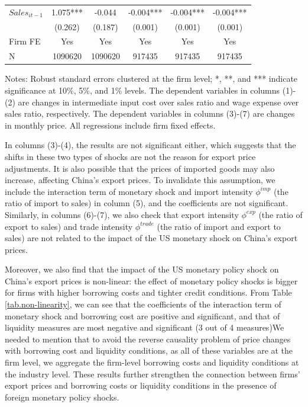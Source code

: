 \begin{table}[htbp]
{\begin{threeparttable}
\begin{tabular}{lccccc}
        $Sales_{it-1}$ &  1.075*** & -0.044   & -0.004*** & -0.004*** & -0.004*** \\
              &  (0.262) & (0.187) & (0.001) & (0.001) & (0.001) \\
        \midrule
        Firm FE & Yes   & Yes   & Yes   & Yes   & Yes \\
        N     & 1090620 & 1090620 & 917435 & 917435 & 917435 \\
        \bottomrule
    \end{tabular}
        \begin{tablenotes}
            \footnotesize
            \item Notes: Robust standard errors clustered at the firm level;  *, **, and *** indicate significance at 10\%, 5\%, and 1\% levels. The dependent variables in columns (1)-(2) are changes in intermediate input cost over sales ratio and wage expense over sales ratio, respectively. The dependent variables in columns (3)-(7) are changes in monthly price. All regressions include firm fixed effects.
	\end{tablenotes}
    \end{threeparttable}
    }
    \label{tab.other}
\end{table}

In columns (3)-(4), the results are not significant either, which suggests that the shifts in these two types of shocks are not the reason for export price adjustments. It is also possible that the prices of imported goods may also increase, affecting China's export prices. To invalidate this assumption, we include the interaction term of monetary shock and import intensity $\phi^{imp}$ (the ratio of import to sales) in column (5), and the coefficients are not significant. Similarly, in columns (6)-(7), we also check that export intensity $\phi^{exp}$ (the ratio of export to sales) and trade intensity $\phi^{trade}$ (the ratio of import and export to sales) are not related to the impact of the US monetary shock on China's export prices.

Moreover, we also find that the impact of the US monetary policy shock on China's export prices is non-linear: the effect of monetary policy shocks is bigger for firms with higher borrowing costs and tighter credit conditions. From Table \ref{tab.non-linearity}, we can see that the coefficients of the interaction term of monetary shock and borrowing cost are positive and significant, and that of liquidity measures are most negative and significant (3 out of 4 measures)We needed to mention that to avoid the reverse causality problem of price changes with borrowing cost and liquidity conditions, as all of these variables are at the firm level, we aggregate the firm-level borrowing costs and liquidity conditions at the industry level. These results further strengthen the connection between firms' export prices and borrowing costs or liquidity conditions in the presence of foreign monetary policy shocks.

